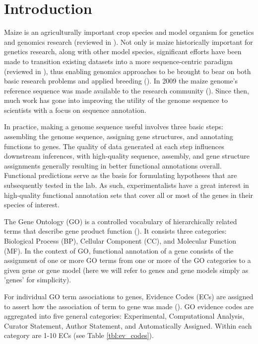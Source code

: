 \section{Introduction}

Maize is an agriculturally important crop species and model organism for genetics and genomics research (reviewed in \cite{lawrence_2004-yE}). Not only is maize historically important for genetics research, along with other model species, significant efforts have been made to transition existing datasets into a more sequence-centric paradigm (reviewed in \cite{sen_2009-Fi}), thus enabling genomics approaches to be brought to bear on both basic research problems and applied breeding (\cite{lawrence_2008-N-}). In 2009 the maize genome's reference sequence was made available to the research community (\cite{schnable_2009-k9}). Since then, much work has gone into improving the utility of the genome sequence to scientists with a focus on sequence annotation.

In practice, making a genome sequence useful involves three basic steps: assembling the genome sequence, assigning gene structures, and annotating functions to genes. The quality of data generated at each step influences downstream inferences, with high-quality sequence, assembly, and gene structure assignments generally resulting in better functional annotations overall. Functional predictions serve as the basis for formulating hypotheses that are subsequently tested in the lab. As such, experimentalists have a great interest in high-quality functional annotation sets that cover all or most of the genes in their species of interest.

The Gene Ontology (GO) is a controlled vocabulary of hierarchically related terms that describe gene product function (\cite{ashburner_2000-2F}). It consists three categories: Biological Process (BP), Cellular Component (CC), and Molecular Function (MF). In the context of GO, functional annotation of a gene consists of the assignment of one or more GO terms from one or more of the GO categories to a given gene or gene model (here we will refer to genes and gene models simply as 'genes' for simplicity).

For individual GO term associations to genes, Evidence Codes (ECs) are assigned to assert how the association of term to gene was made (\cite{harris_2004-KO}). GO evidence codes are aggregated into five general categories: Experimental, Computational Analysis, Curator Statement, Author Statement, and Automatically Assigned. Within each category are 1-10 ECs (see Table \ref{tbl:ev_codes}).

